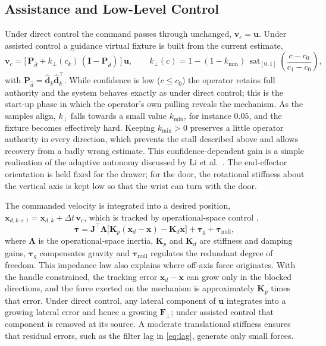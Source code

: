 \documentclass[11pt,letterpaper]{article}
\newcommand{\vect}[1]{\bm{#1}}
\newcommand{\Pd}{\mathbf{P}_{\hat d}}
\newcommand{\I}{\mathbf{I}}
\newcommand{\vuser}{\vect{u}}
\newcommand{\vcmd}{\vect{v}_{c}}
\newcommand{\Fperp}{\vect{F}_{\perp}}
\DeclareMathOperator{\sat}{sat}
\begin{document}
\subsection{Assistance and Low-Level Control}
\label{sec:assist}

Under direct control the command passes through unchanged, $\vcmd=\vuser$. Under assisted control a guidance virtual fixture \cite{marayong2003spatial} is built from the current estimate,
\begin{equation}
  \vcmd = \bigl[\,\Pd + k_\perp(c_k)\,(\I-\Pd)\,\bigr]\,\vuser,
  \qquad
  k_\perp(c) = 1 - (1-k_{\min})\,\sat_{[0,1]}\!\left(\frac{c-c_0}{c_1-c_0}\right),
  \label{eq:assist}
\end{equation}
with $\Pd=\hat{\vect d}_k\hat{\vect d}_k^{\top}$. While confidence is low ($c\le c_0$) the operator retains full authority and the system behaves exactly as under direct control; this is the start-up phase in which the operator's own pulling reveals the mechanism. As the samples align, $k_\perp$ falls towards a small value $k_{\min}$, for instance $0.05$, and the fixture becomes effectively hard. Keeping $k_{\min}>0$ preserves a little operator authority in every direction, which prevents the stall described above and allows recovery from a badly wrong estimate. This confidence-dependent gain is a simple realisation of the adaptive autonomy discussed by Li et al.\ \cite{li2023classification}. The end-effector orientation is held fixed for the drawer; for the door, the rotational stiffness about the vertical axis is kept low so that the wrist can turn with the door.

The commanded velocity is integrated into a desired position, $\vect x_{d,k+1}=\vect x_{d,k}+\Delta t\,\vcmd$, which is tracked by operational-space control \cite{khatib1987unified},
\begin{equation}
  \bm\tau = \mathbf J^{\top}\bm\Lambda\bigl[\mathbf K_p(\vect x_d-\vect x)-\mathbf K_d\dot{\vect x}\bigr] + \bm\tau_g + \bm\tau_{\mathrm{null}},
  \label{eq:osc}
\end{equation}
where $\bm\Lambda$ is the operational-space inertia, $\mathbf K_p$ and $\mathbf K_d$ are stiffness and damping gains, $\bm\tau_g$ compensates gravity and $\bm\tau_{\mathrm{null}}$ regulates the redundant degree of freedom. This impedance law \cite{hogan1985impedance} also explains where off-axis force originates. With the handle constrained, the tracking error $\vect x_d-\vect x$ can grow only in the blocked directions, and the force exerted on the mechanism is approximately $\mathbf K_p$ times that error. Under direct control, any lateral component of $\vuser$ integrates into a growing lateral error and hence a growing $\Fperp$; under assisted control that component is removed at its source. A moderate translational stiffness ensures that residual errors, such as the filter lag in \eqref{eq:lag}, generate only small forces.
\end{document}
